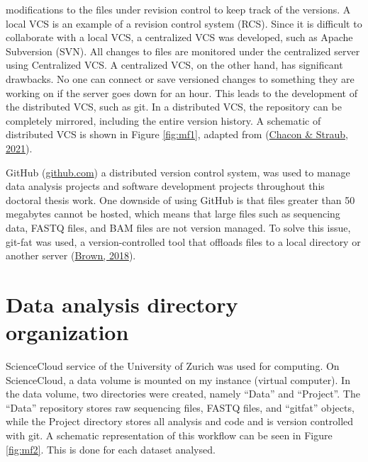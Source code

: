 \documentclass[12pt,twoside]{reedthesis}
\begin{document}
modifications to the files under revision control to keep track of the
versions. A local VCS is an example of a revision control system (RCS).
Since it is difficult to collaborate with a local VCS, a centralized VCS
was developed, such as Apache Subversion (SVN). All changes to files are
monitored under the centralized server using Centralized VCS. A
centralized VCS, on the other hand, has significant drawbacks. No one
can connect or save versioned changes to something they are working on
if the server goes down for an hour. This leads to the development of
the distributed VCS, such as git. In a distributed VCS, the repository
can be completely mirrored, including the entire version history. A
schematic of distributed VCS is shown in Figure \ref{fig:mf1}, adapted from
(\protect\hyperlink{ref-chacon2021}{Chacon \& Straub, 2021}).

GitHub (\href{https://github.com}{github.com}) a distributed
version control system, was used to manage data analysis projects and
software development projects throughout this doctoral thesis work. One
downside of using GitHub is that files greater than 50 megabytes cannot
be hosted, which means that large files such as sequencing data, FASTQ
files, and BAM files are not version managed. To solve this issue,
git-fat was used, a version-controlled tool that offloads files to a
local directory or another server (\protect\hyperlink{ref-brown2018}{Brown, 2018}).

\hypertarget{m2}{%
\section*{Data analysis directory organization}\label{m2}}

ScienceCloud service of the University of Zurich was used for computing.
On ScienceCloud, a data volume is mounted on my instance (virtual
computer). In the data volume, two directories were created, namely
``Data'' and ``Project''. The ``Data'' repository stores raw sequencing files,
FASTQ files, and ``gitfat'' objects, while the Project directory stores
all analysis and code and is version controlled with git. A schematic
representation of this workflow can be seen in Figure \ref{fig:mf2}. This is done
for each dataset analysed.
\end{document}
